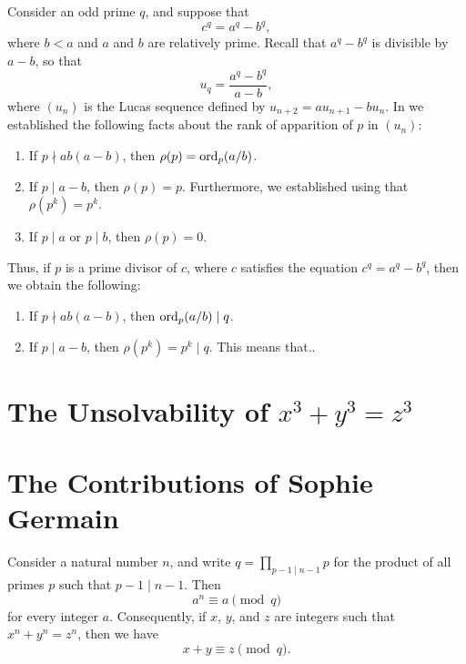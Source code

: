 \begin{remark}
  Consider an odd prime $q$, and suppose that
  \begin{equation*}
    c^q =a^q-b^q,
  \end{equation*}
  where $b<a$ and $a$ and $b$ are relatively prime. Recall that $a^q-b^q$ is divisible by $a-b$, so that
  \begin{equation*}
    u_q=\frac{a^q-b^q}{a-b},
  \end{equation*}
  where $(u_n)$ is the Lucas sequence defined by $u_{n+2}=au_{n+1}-bu_n$. In  we established the following facts about the rank of apparition of $p$ in $(u_n)$:
  \begin{enumerate}
  \item If $p\nmid ab(a-b)$, then $\rho(p)=\operatorname{ord}_p(a/b)$.
  \item If $p\mid a-b$, then $\rho(p)=p$. Furthermore, we established using  that $\rho(p^k)=p^k$.
  \item If $p\mid a$ or $p\mid b$, then $\rho(p)=0$.
  \end{enumerate}
  Thus, if $p$ is a prime divisor of $c$, where $c$ satisfies the equation $c^q=a^q-b^q$, then we obtain the following:
  \begin{enumerate}
  \item If $p\nmid ab(a-b)$, then $\operatorname{ord}_p(a/b)\mid q$.
  \item If $p\mid a-b$, then $\rho(p^k)=p^k\mid q$. This means that..
  \end{enumerate}
\end{remark}

\section{The Unsolvability of \texorpdfstring{$x^3+y^3=z^3$}{x³+y³=z³}}

\section{The Contributions of Sophie Germain}

\begin{theorem}
  Consider a  natural number $n$, and write $q=\prod_{p-1\mid n-1}p$ for the product of all primes $p$ such that $p-1\mid n-1$. Then
  \begin{equation*}
    a^n\equiv a \pmod{q}
  \end{equation*}
  for every integer $a$. Consequently, if $x$, $y$, and $z$ are integers such that $x^n+y^n=z^n$, then we have
  \begin{equation*}
    x+y\equiv z\pmod{q}.
  \end{equation*}
\end{theorem}


